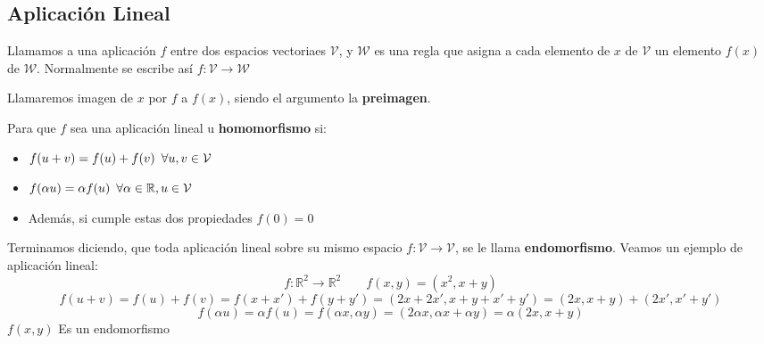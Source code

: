 \subsection{Aplicación Lineal}
Llamamos a una aplicación \(f\) entre dos espacios vectoriaes \(\mathcal{V}\), y \(\mathcal{W}\) es una regla que asigna a cada elemento de \(x\) de \(\mathcal{V}\) un elemento \(f(x)\) de \(\mathcal{W}\). Normalmente se escribe así \(f: \mathcal{V} \rightarrow \mathcal{W}\)
\par Llamaremos imagen de \(x\) por \(f\) a \(f(x)\), siendo el argumento la \textbf{preimagen}.
\par Para que \(f\) sea una aplicación lineal u \textbf{homomorfismo} si:
\begin{itemize}
        \item \(f(u+v) = f(u) + f(v) \hspace{.5em} \forall u,v \in \mathcal{V}\)
        \item \(f(\alpha u) = \alpha f(u) \hspace{.5em} \forall \alpha \in \mathbb{R}, u \in \mathcal{V}\)
        \item Además, si cumple estas dos propiedades \(f(0) = 0\)
\end{itemize}
Terminamos diciendo, que toda aplicación lineal sobre su mismo espacio \(f: \mathcal{V} \rightarrow \mathcal{V}\), se le llama  \textbf{endomorfismo}. Veamos un ejemplo de aplicación lineal:
\[
        f: \mathbb{R}^2 \rightarrow \mathbb{R}^2 \hspace{2em} f(x,y) = (x^2, x + y)
\]
\[
        f(u + v) = f(u) + f(v) = f(x + x') + f(y + y') = (2x + 2x', x + y + x' + y') = (2x, x + y) + (2x', x' + y')
\]
\[
        f(\alpha u) = \alpha f(u) =  f(\alpha x, \alpha y) = (2\alpha x, \alpha x + \alpha y) = \alpha (2x, x +y)
\]
\(f(x,y)\) Es un endomorfismo
